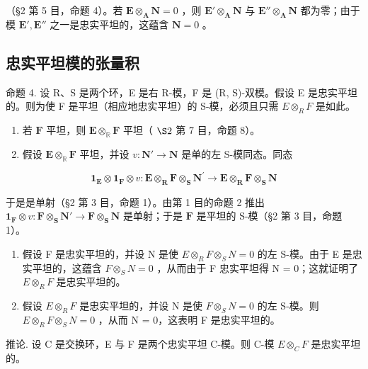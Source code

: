 （§2 第 5 目，命题 4）。若 \(\mathbf{E} \otimes_{\mathbf{A}} \mathbf{N} = 0\) ，则 \(\mathbf{E}' \otimes_{\mathbf{A}} \mathbf{N}\) 与 \(\mathbf{E}'' \otimes_{\mathbf{A}} \mathbf{N}\) 都为零；由于模 \(\mathbf{E}', \mathbf{E}''\) 之一是忠实平坦的，这蕴含 \(\mathbf{N} = 0\) 。

\subsection{忠实平坦模的张量积}

命题 4. 设 R、S 是两个环，E 是右 R-模，F 是 (R, S)-双模。假设 E 是忠实平坦的。则为使 F 是平坦（相应地忠实平坦）的 S-模，必须且只需 \(E \otimes_{R} F\) 是如此。

\begin{enumerate}
\def\labelenumi{(\arabic{enumi})}
\item
  若 \(\mathbf{F}\) 平坦，则 \(\mathbf{E} \otimes_{\mathbb{R}} \mathbf{F}\) 平坦（ \(\S 2\) 第 7 目，命题 8）。
\item
  假设 \(\mathbf{E} \otimes_{\mathbb{R}} \mathbf{F}\) 平坦，并设 \(v: \mathbf{N}' \to \mathbf{N}\) 是单的左 S-模同态。同态
\end{enumerate}

\[
  \mathbf {1} _ {\mathbf {E}} \otimes \mathbf {1} _ {\mathbf {F}} \otimes v: \mathbf {E} \otimes_ {\mathbf {R}} \mathbf {F} \otimes_ {\mathbf {S}} \mathbf {N} ^ {\prime} \rightarrow \mathbf {E} \otimes_ {\mathbf {R}} \mathbf {F} \otimes_ {\mathbf {S}} \mathbf {N}
\]

于是是单射（§2 第 3 目，命题 1）。由第 1 目的命题 2 推出 \(\mathbf{1}_{\mathbf{F}} \otimes v \colon \mathbf{F} \otimes_{\mathbf{S}} \mathbf{N}' \to \mathbf{F} \otimes_{\mathbf{S}} \mathbf{N}\) 是单射；于是 \(\mathbf{F}\) 是平坦的 S-模（§2 第 3 目，命题 1）。

\begin{enumerate}
\def\labelenumi{(\arabic{enumi})}
\setcounter{enumi}{2}
\item
  假设 F 是忠实平坦的，并设 N 是使 \(E \otimes_{R} F \otimes_{S} N = 0\) 的左 S-模。由于 E 是忠实平坦的，这蕴含 \(F \otimes_{S} N = 0\) ，从而由于 F 忠实平坦得 N = 0；这就证明了 \(E \otimes_{R} F\) 是忠实平坦的。
\item
  假设 \(E \otimes_{R} F\) 是忠实平坦的，并设 N 是使 \(F \otimes_{S} N = 0\) 的左 S-模。则 \(E \otimes_{R} F \otimes_{S} N = 0\) ，从而 N = 0，这表明 F 是忠实平坦的。
\end{enumerate}

推论. 设 C 是交换环，E 与 F 是两个忠实平坦 C-模。则 C-模 \(E \otimes_{C} F\) 是忠实平坦的。

